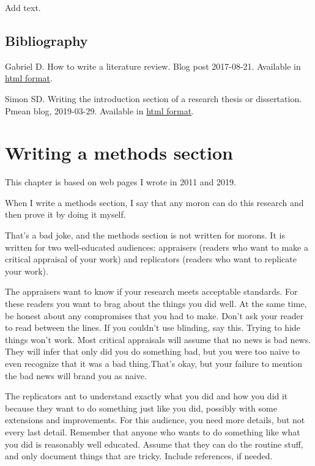 \documentclass[
  letterpaper,
  DIV=11,
  numbers=noendperiod]{scrreprt}
\begin{document}
Add text.

\section{Bibliography}\label{bibliography-5}

Gabriel D. How to write a literature review. Blog post 2017-08-21.
Available in
\href{https://deborahgabriel.com/2017/08/21/how-to-write-a-literature-review/}{html
format}.

Simon SD. Writing the introduction section of a research thesis or
dissertation. Pmean blog, 2019-03-29. Available in
\href{http://pmean.com/posts/introduction-section/}{html format}.


\chapter{Writing a methods section}\label{writing-a-methods-section}

This chapter is based on web pages I wrote in 2011 and 2019.

When I write a methods section, I say that any moron can do this
research and then prove it by doing it myself.

That's a bad joke, and the methods section is not written for morons. It
is written for two well-educated audiences: appraisers (readers who want
to make a critical appraisal of your work) and replicators (readers who
want to replicate your work).

The appraisers want to know if your research meets acceptable standards.
For these readers you want to brag about the things you did well. At the
same time, be honest about any compromises that you had to make. Don't
ask your reader to read between the lines. If you couldn't use blinding,
say this. Trying to hide things won't work. Most critical appraisals
will assume that no news is bad news. They will infer that only did you
do something bad, but you were too naive to even recognize that it was a
bad thing.That's okay, but your failure to mention the bad news will
brand you as naive.

The replicators ant to understand exactly what you did and how you did
it because they want to do something just like you did, possibly with
some extensions and improvements. For this audience, you need more
details, but not every last detail. Remember that anyone who wants to do
something like what you did is reasonably well educated. Assume that
they can do the routine stuff, and only document things that are tricky.
Include references, if needed.
\end{document}
